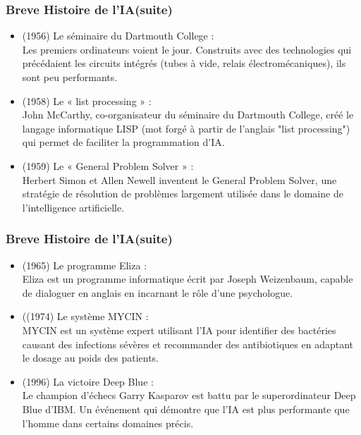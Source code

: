 \documentclass{beamer}
\begin{document}
	\begin{frame}
	\frametitle{Breve Histoire de l'IA(suite)}
	\begin{itemize}
		\itemsep1em
		\item (1956) Le séminaire du Dartmouth College :\\
		 Les premiers ordinateurs voient le jour. Construits avec des technologies qui précédaient les circuits intégrés (tubes à vide, relais électromécaniques), ils sont peu performants.
		 
		 \item (1958) Le « list processing » : \\
		 John McCarthy, co-organisateur du séminaire du Dartmouth College, créé le langage informatique LISP (mot forgé à partir de l’anglais "list processing") qui permet de faciliter la programmation d’IA.

		 \item (1959) Le « General Problem Solver » :\\
		 Herbert Simon et Allen Newell inventent le General Problem Solver, une stratégie de résolution de problèmes largement utilisée dans le domaine de l'intelligence artificielle.

	\end{itemize}
	\end{frame}
	
	\begin{frame}
	\frametitle{Breve Histoire de l'IA(suite)}
	\begin{itemize}
		\itemsep1em
		\item (1965) Le programme Eliza :\\
		 Eliza est un programme informatique écrit par Joseph Weizenbaum, capable de dialoguer en anglais en incarnant le rôle d’une psychologue.

		 \item ((1974) Le système MYCIN : \\
		 MYCIN est un système expert utilisant l’IA pour identifier des bactéries causant des infections 	sévères et recommander des antibiotiques en adaptant le dosage au poids des patients.

		 \item (1996) La victoire Deep Blue :\\
		 Le champion d’échecs Garry Kasparov est battu par le superordinateur Deep Blue d’IBM. Un événement qui démontre que l’IA est plus performante que l’homme dans certains domaines précis.

	\end{itemize}
	\end{frame}
	
\end{document}

